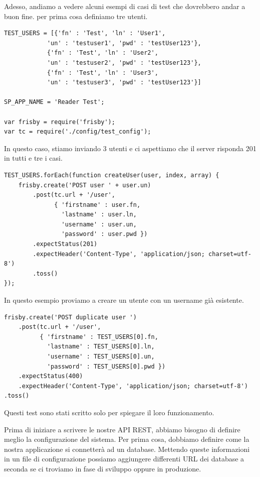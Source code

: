 Adesso, andiamo a vedere alcuni esempi di casi di test che dovrebbero andar a buon fine. per prima cosa definiamo tre utenti.

\begin{lstlisting}[caption={test/user/create\_accounts\_spec.js}, style=javaScriptCode]
TEST_USERS = [{'fn' : 'Test', 'ln' : 'User1',
           	'un' : 'testuser1', 'pwd' : 'testUser123'},
          	{'fn' : 'Test', 'ln' : 'User2',
           	'un' : 'testuser2', 'pwd' : 'testUser123'},
          	{'fn' : 'Test', 'ln' : 'User3',
           	'un' : 'testuser3', 'pwd' : 'testUser123'}]

SP_APP_NAME = 'Reader Test';

var frisby = require('frisby');
var tc = require('./config/test_config');
\end{lstlisting}

In questo caso, stiamo inviando 3 utenti e ci aspettiamo che il server risponda 201 in tutti e tre i casi.

\begin{lstlisting}[caption={test/user/create\_accounts\_spec.js}, style=javaScriptCode]
TEST_USERS.forEach(function createUser(user, index, array) {
    frisby.create('POST user ' + user.un)
        .post(tc.url + '/user',
              { 'firstname' : user.fn,
                'lastname' : user.ln,
                'username' : user.un,
                'password' : user.pwd })
        .expectStatus(201)
        .expectHeader('Content-Type', 'application/json; charset=utf-8')
        .toss()
});
\end{lstlisting}

In questo esempio proviamo a creare un utente con un username già esistente.

\begin{lstlisting}[caption={test/user/create\_accounts\_spec.js}, style=javaScriptCode]
frisby.create('POST duplicate user ')
    .post(tc.url + '/user',
          { 'firstname' : TEST_USERS[0].fn,
            'lastname' : TEST_USERS[0].ln,
            'username' : TEST_USERS[0].un,
            'password' : TEST_USERS[0].pwd })
    .expectStatus(400)
    .expectHeader('Content-Type', 'application/json; charset=utf-8')
.toss()
\end{lstlisting}

Questi test sono stati scritto solo per spiegare il loro funzionamento. 

Prima di iniziare a scrivere le nostre API REST, abbiamo bisogno di definire meglio la configurazione del sistema. 
Per prima cosa, dobbiamo definire come la nostra applicazione si connetterà ad un database. 
Mettendo queste informazioni in un file di configurazione possiamo aggiungere differenti URL dei database a seconda se ci troviamo in fase di sviluppo oppure in produzione.

